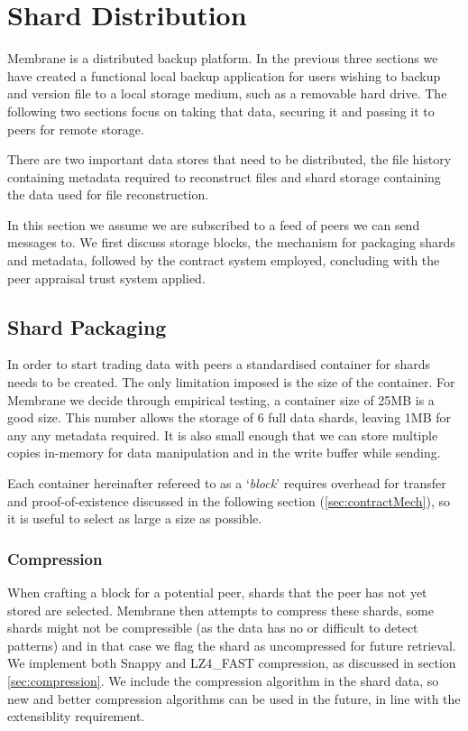 \documentclass[11pt, a4paper, twocolumn, twoside]{report}
\begin{document}
\section{Shard Distribution}

Membrane is a distributed backup platform. In the previous three sections we have created a functional local backup application for users wishing to backup and version file to a local storage medium, such as a removable hard drive. The following two sections focus on taking that data, securing it and passing it to peers for remote storage.

There are two important data stores that need to be distributed, the file history containing metadata required to reconstruct files and shard storage containing the data used for file reconstruction.

In this section we assume we are subscribed to a feed of peers we can send messages to. We first discuss storage blocks, the mechanism for packaging shards and metadata, followed by the contract system employed, concluding with the peer appraisal trust system applied.

\subsection{Shard Packaging}

In order to start trading data with peers a standardised container for shards needs to be created. The only limitation imposed is the size of the container. For Membrane we decide through empirical testing, a container size of 25MB is a good size. This number allows the storage of 6 full data shards, leaving 1MB for any any metadata required. It is also small enough that we can store multiple copies in-memory for data manipulation and in the write buffer while sending.

Each container hereinafter refereed to as a `\emph{block}' requires overhead for transfer and proof-of-existence discussed in the following section (\ref{sec:contractMech}), so it is useful to select as large a size as possible.

\subsubsection{Compression}

When crafting a block for a potential peer, shards that the peer has not yet stored are selected. Membrane then attempts to compress these shards, some shards might not be compressible (as the data has no or difficult to detect patterns) and in that case we flag the shard as uncompressed for future retrieval. We implement both Snappy and LZ4\_FAST compression, as discussed in section \ref{sec:compression}. We include the compression algorithm in the shard data, so new and better compression algorithms can be used in the future, in line with the extensiblity requirement.
\end{document}
